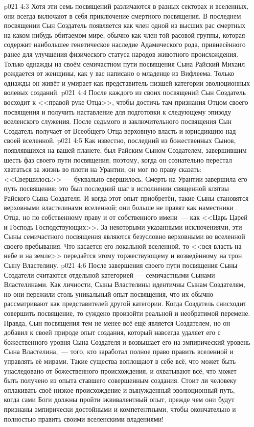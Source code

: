 \vs p021 4:3 Хотя эти семь посвящений различаются в разных секторах и вселенных, они всегда включают в себя приключение смертного посвящения. В последнем посвящении Сын Создатель появляется как член одной из высших рас смертных на каком\hyp{}нибудь обитаемом мире, обычно как член той расовой группы, которая содержит наибольшее генетическое наследие Адамического рода, привнесённого ранее для улучшения физического статуса народов животного происхождения. Только однажды на своём семичастном пути посвящения Сына Райский Михаил рождается от женщины, как у вас написано о младенце из Вифлеема. Только однажды он живёт и умирает как представитель низшей категории эволюционных волевых созданий.
\vs p021 4:4 После каждого из своих посвящений Сын Создатель восходит к <<правой руке Отца>>, чтобы достичь там признания Отцом своего посвящения и получить наставление для подготовки к следующему эпизоду вселенского служения. После седьмого и заключительного посвящения Сын Создатель получает от Всеобщего Отца верховную власть и юрисдикцию над своей вселенной.
\vs p021 4:5 \pc Как известно, последний из божественных Сынов, появлявшихся на вашей планете, был Райским Сыном Создателем, завершившим шесть фаз своего пути посвящения; поэтому, когда он сознательно перестал хвататься за жизнь во плоти на Урантии, он мог по праву сказать: <<Свершилось>>~--- буквально свершилось. Смерть на Урантии завершила его путь посвящения; это был последний шаг в исполнении священной клятвы Райского Сына Создателя. И когда этот опыт приобретён, такие Сыны становятся верховными властелинами вселенной; они больше не правят как наместники Отца, но по собственному праву и от собственного имени~--- как <<Царь Царей и Господь Господствующих>>. За некоторыми указанными исключениями, эти Сыны семичастного посвящения являются безусловно верховными во вселенной своего пребывания. Что касается его локальной вселенной, то <<вся власть на небе и на земле>> передаётся этому торжествующему и возведённому на трон Сыну Властелину.
\vs p021 4:6 \pc После завершения своего пути посвящения Сыны Создатели считаются отдельной категорией~--- семичастными Сынами Властелинами. Как личности, Сыны Властелины идентичны Сынам Создателям, но они пережили столь уникальный опыт посвящения, что их обычно рассматривают как представителей другой категории. Когда Создатель снисходит совершить посвящение, то суждено произойти реальной и необратимой перемене. Правда, Сын посвящения тем не менее всё ещё является Создателем, но он добавил к своей природе опыт создания, который навсегда удаляет его с божественного уровня Сына Создателя и возвышает его на эмпирический уровень Сына Властелина,~--- того, кто заработал полное право править вселенной и управлять её мирами. Такие существа воплощают в себе всё, что может быть унаследовано от божественного происхождения, и охватывают всё, что может быть получено из опыта ставшего совершенным создания. Стоит ли человеку оплакивать своё низкое происхождение и вынужденный эволюционный путь, когда сами Боги должны пройти эквивалентный опыт, прежде чем они будут признаны эмпирически достойными и компетентными, чтобы окончательно и полностью править своими вселенскими владениями!
